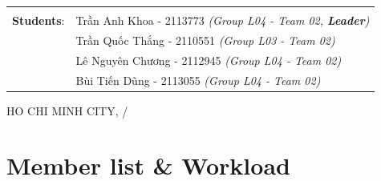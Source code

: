 \documentclass[a4paper, 11pt]{article}
\begin{document}
\begin{titlepage}
\begin{table}[h]
\begin{tabular}{rl}
                               &                                                                       \\[10pt]
            \textbf{Students}: & Trần Anh Khoa - 2113773 \emph{(Group L04 - Team 02, \textbf{Leader})} \\
                               & Trần Quốc Thắng - 2110551 \emph{(Group L03 - Team 02)}                \\
                               & Lê Nguyên Chương - 2112945 \emph{(Group L04 - Team 02)}               \\
                               & Bùi Tiến Dũng - 2113055 \emph{(Group L04 - Team 02)}                  \\
        \end{tabular}
    \end{table}

    \begin{center}
        {\footnotesize HO CHI MINH CITY, \the\month/\the\year}
    \end{center}
\end{titlepage}

\pagebreak
\tableofcontents
\pagebreak

\printunsrtglossary[type={symbols}, title={List of Symbols}]
\printunsrtglossary[type={abbreviations}, title={List of Acronyms}]
\pagebreak
\listoffigures
\listoftables
\pagebreak
{}


\section*{Member list \& Workload}
\end{document}
